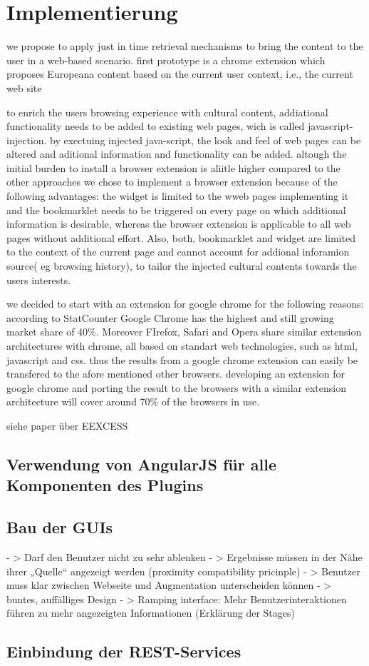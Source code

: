 \section{Implementierung}
we propose to apply just in time retrieval mechanisms to bring the content to the user in a web-based scenario.
 	first prototype is a chrome extension which proposes Europeana content based on the current user context, i.e., the current web site

 	to enrich the users browsing experience with cultural content, addiational functionality needs to be added to existing web pages, wich is called javascript-injection. by exectuing injected java-script, the look and feel of web pages can be altered and aditional information and functionality can be added.
 	altough the initial burden to install a browser extension is aliitle higher compared to the other approaches we chose to implement a browser extension because of the following advantages: the widget is limited to the wweb pages implementing it and the bookmarklet needs to be triggered on every page on which additional information is desirable, whereas the browser extension is applicable to all web pages without additional effort. Also, both, bookmarklet and widget are limited to the context of the current page and cannot account for addional inforamion source( eg browsing history), to tailor the injected cultural contents towards the users interests.

 	we decided to start with an extension for google chrome for the following reasons: according to StatCounter Google Chrome has the highest and still growing market share of 40\%. Moreover FIrefox, Safari and Opera share similar extension architectures with chrome, all based on standart web technologies, such as html, javascript and css. thus the results from a google chrome extension can easily be transfered to the afore mentioned other browsers. developing an extension for google chrome and porting the result to the browsers with a similar extension architecture will cover around 70\% of the browsers in use.

 	siehe paper über EEXCESS
 \subsection{Verwendung von AngularJS für alle Komponenten des Plugins}
 \subsection{Bau der GUIs}
		- > Darf den Benutzer nicht zu sehr ablenken
		- > Ergebnisse müssen in der Nähe ihrer „Quelle“ angezeigt werden (proximity compatibility pricinple)
		- > Benutzer muss klar zwischen Webseite und Augmentation unterscheiden können
		- > buntes, auffälliges Design
		- > Ramping interface: Mehr Benutzerinteraktionen führen zu mehr angezeigten Informationen (Erklärung der Stages) 
 \subsection{Einbindung der REST-Services}